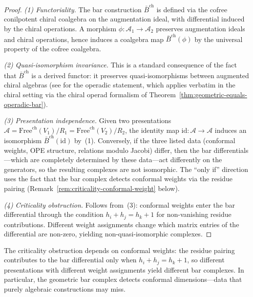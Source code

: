    \begin{proof}
   \emph{(1) Functoriality.} The bar construction $\bar{B}^{\mathrm{ch}}$ is defined via the cofree conilpotent chiral coalgebra on the augmentation ideal, with differential induced by the chiral operations.  A morphism $\phi\colon \mathcal{A}_1 \to \mathcal{A}_2$ preserves augmentation ideals and chiral operations, hence induces a coalgebra map $\bar{B}^{\mathrm{ch}}(\phi)$ by the universal property of the cofree coalgebra.

   \emph{(2) Quasi-isomorphism invariance.} This is a standard consequence of the fact that $\bar{B}^{\mathrm{ch}}$ is a derived functor: it preserves quasi-isomorphisms between augmented chiral algebras (see \cite[Theorem~2.2.4]{LodayVallette} for the operadic statement, which applies verbatim in the chiral setting via the chiral operad formalism of Theorem~\ref{thm:geometric-equals-operadic-bar}).

   \emph{(3) Presentation independence.} Given two presentations $\mathcal{A} = \mathrm{Free}^{\mathrm{ch}}(V_1)/R_1 = \mathrm{Free}^{\mathrm{ch}}(V_2)/R_2$, the identity map $\mathrm{id}\colon \mathcal{A} \to \mathcal{A}$ induces an isomorphism $\bar{B}^{\mathrm{ch}}(\mathrm{id})$ by~(1).  Conversely, if the three listed data (conformal weights, OPE structure, relations modulo Jacobi) differ, then the bar differentials---which are completely determined by these data---act differently on the generators, so the resulting complexes are not isomorphic.  The ``only if'' direction uses the fact that the bar complex detects conformal weights via the residue pairing (Remark~\ref{rem:criticality-conformal-weight} below).

   \emph{(4) Criticality obstruction.} Follows from~(3): conformal weights enter the bar differential through the condition $h_i + h_j = h_k + 1$ for non-vanishing residue contributions. Different weight assignments change which matrix entries of the differential are non-zero, yielding non-quasi-isomorphic complexes.
   \end{proof}
   
   \begin{remark}\label{rem:criticality-conformal-weight}
   The criticality obstruction depends on conformal weights: the residue pairing
   contributes to the bar differential only when $h_i + h_j = h_k + 1$, so
   different presentations with different weight assignments yield different bar
   complexes.  In particular, the geometric bar complex detects conformal
   dimensions---data that purely algebraic constructions may miss.
   \end{remark}
   
